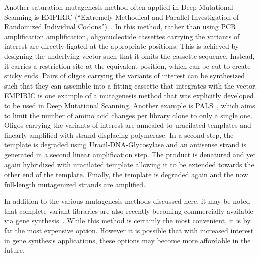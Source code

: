 Another saturation mutagenesis method often applied in Deep Mutational Scanning is EMPIRIC (``Extremely Methodical and Parallel Investigation of Randomized Individual Codons'')~\cite{hietpas_experimental_2011}. In this method, rather than using PCR amplification amplification, oligonucleotide cassettes carrying the variants of interest are directly ligated at the appropriate positions. This is achieved by designing the underlying vector such that it omits the cassette sequence. Instead, it carries a restriction site at the equivalent position, which can be cut to create sticky ends. Pairs of oligos carrying the variants of interest can be synthesized such that they can assemble into a fitting cassette that integrates with the vector.
EMPIRIC is one example of a mutagenesis method that was explicitly developed to be used in Deep Mutational Scanning. Another example is PALS~\cite{kitzman_massively_2015}, which aims to limit the number of amino acid changes per library clone to only a single one. Oligos carrying the variants of interest are annealed to uracilated templates and linearly amplified with strand-displacing polymerase. In a second step, the template is degraded using Uracil-DNA-Glycosylase and an antisense strand is generated in a second linear amplification step. The product is denatured and yet again hybridized with uracilated template allowing it to be extended towards the other end of the template. Finally, the template is degraded again and the now full-length mutagenized strands are amplified.

In addition to the various mutagenesis methods discussed here, it may be noted that complete variant libraries are also recently becoming commercially available via gene synthesis~\cite{kosuri_scalable_2010}. While this method is certainly the most convenient, it is by far the most expensive option. However it is possible that with increased interest in gene synthesis applications, these options may become more affordable in the future.


